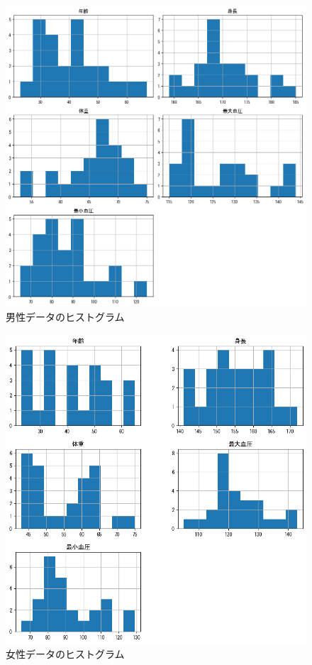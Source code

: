 \documentclass[dvipdfmx]{jsarticle}
\begin{document}
    \begin{figure}[H]
        \centering
        \includegraphics[scale=0.6]{./images/male/hist.png}
        \caption{男性データのヒストグラム}
    \end{figure}
    \begin{figure}[H]
        \centering
        \includegraphics[scale=0.6]{./images/female/hist.png}
        \caption{女性データのヒストグラム}
    \end{figure}
\newpage
\end{document}
